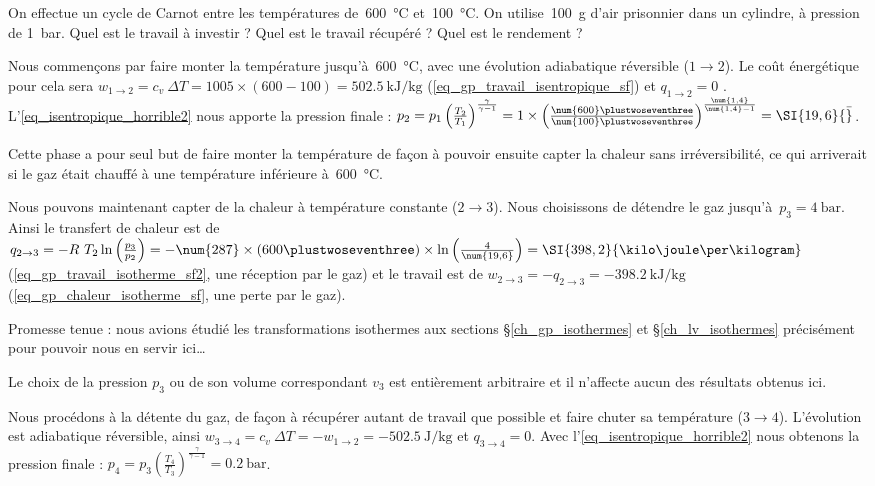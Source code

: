 		\begin{anexample}
		\label{ex_cycle_carnot}
			On effectue un cycle de Carnot entre les températures de~\SI{600}{\degreeCelsius} et~\SI{100}{\degreeCelsius}. On utilise~\SI{100}{\gram} d’air prisonnier dans un cylindre, à pression de \SI{1}{\bar}. Quel est le travail à investir ? Quel est le travail récupéré ? Quel est le rendement ?
				 \begin{answer}
				 	Nous commençons par faire monter la température jusqu’à~\SI{600}{\degreeCelsius}, avec une évolution adiabatique réversible ($1\to 2$). Le coût énergétique pour cela sera $w_{1\to 2} = c_v \ \Delta T = \num{1005}\times(\num{600}-\num{100}) = \SI{+502,5}{\kilo\joule\per\kilogram}$ (\ref{eq_gp_travail_isentropique_sf}) et $q_{1\to 2} = 0$ . L’\cref{eq_isentropique_horrible2} nous apporte la pression finale : $p_2 
				 	= p_1 \left(\frac{T_2}{T_1}\right)^{\frac{\gamma}{\gamma - 1}} 
				 	= 1 \times \left(\frac{\num{600}\plustwoseventhree}{\num{100}\plustwoseventhree}\right)^{\frac{\num{1,4}}{\num{1,4} - 1}}
				 	= \SI{19,6}{\bar}$.
				 		\begin{remark}Cette phase a pour seul but de faire monter la température de façon à pouvoir ensuite capter la chaleur sans irréversibilité, ce qui arriverait si le gaz était chauffé à une température inférieure à~\SI{600}{\degreeCelsius}.\end{remark}
					Nous pouvons maintenant capter de la chaleur à température constante ($2 \to 3$). Nous choisissons de détendre le gaz jusqu’à~$p_3 = \SI{4}{\bar}$. Ainsi le transfert de chaleur est de $q_{2 \to 3} 
					= - R \ T_2 \ln\left(\frac{p_3}{p_2}\right)
					= - \num{287} \times (600\plustwoseventhree) \times \ln \left(\frac{4}{\num{19,6}}\right)
					= \SI{398,2}{\kilo\joule\per\kilogram}$ (\ref{eq_gp_travail_isotherme_sf2}, une réception par le gaz) et le travail est de $w_{2 \to 3} = - q_{2 \to 3} = \SI{-398,2}{\kilo\joule\per\kilogram}$ (\ref{eq_gp_chaleur_isotherme_sf}, une perte par le gaz).
						\begin{remark}Promesse tenue : nous avions étudié les transformations isothermes aux sections \S\ref{ch_gp_isothermes} et \S\ref{ch_lv_isothermes} précisément pour pouvoir nous en servir ici…\end{remark}
				 		\begin{remark}Le choix de la pression $p_3$ ou de son volume correspondant $v_3$ est entièrement arbitraire et il n’affecte aucun des résultats obtenus ici.\end{remark}
				 	Nous procédons à la détente du gaz, de façon à récupérer autant de travail que possible et faire chuter sa température ($3 \to 4$). L’évolution est adiabatique réversible, ainsi $w_{3\to 4} = c_v \ \Delta T = -w_{1\to 2} = \SI{-502,5}{\joule\per\kilogram}$ et $q_{3\to 4} = 0$. Avec l’\cref{eq_isentropique_horrible2} nous obtenons la pression finale : $p_4 = p_3 \left(\frac{T_4}{T_3}\right)^{\frac{\gamma}{\gamma - 1}} = \SI{0,2}{\bar}$.

\end{answer}
\end{anexample}
